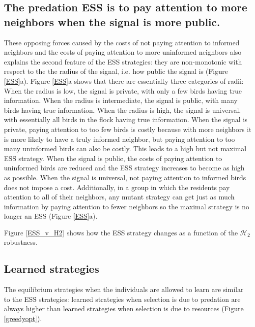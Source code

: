 \documentclass{article}
\begin{document}
\subsection{The predation ESS is to pay attention to more neighbors when the signal is more public.}
These opposing forces caused by the costs of not paying attention to informed neighbors  and the costs of paying attention to more uninformed neighbors  also explains the second feature of the ESS strategies: they are non-monotonic with respect to the the radius of the signal, i.e. how public the signal is (Figure \ref{ESS}a). Figure \ref{ESS}a shows that there are essentially three categories of radii: When the radius is low, the signal is private, with only a few birds having true information. When the radius is intermediate, the signal is public, with many birds having true information. When the radius is high, the signal is universal, with essentially all birds in the flock having true information. When the signal is private, paying attention to too few birds is costly because with more neighbors it is more likely to have a truly informed neighbor, but paying attention to too many uninformed birds can also be costly. This leads to a high but not maximal ESS strategy. When the signal is public, the costs of paying attention to uninformed birds are reduced and the ESS strategy increases to become as high as possible. When the signal is universal, not paying attention to informed birds does not impose a cost. Additionally, in a group in which the residents pay attention to all of their neighbors, any mutant strategy can get just as much information by paying attention to fewer neighbors so the maximal strategy is no longer an ESS (Figure \ref{ESS}a).

Figure \ref{ESS_v_H2} shows how the ESS strategy changes as a function of the $\mathscr{H}_2$ robustness.

\subsection{Learned strategies }
The equilibrium strategies when the individuals are allowed to learn are similar to the ESS strategies: learned strategies when selection is due to predation are always higher than learned strategies when selection is due to resources (Figure \ref{greedyopt}). 
\end{document}
